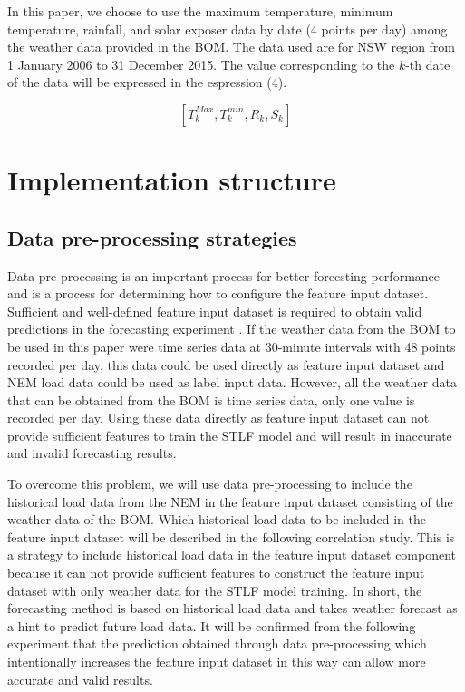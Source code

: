 \documentclass[runningheads,a4paper]{llncs}
\begin{document}
In this paper, we choose to use the maximum temperature, minimum temperature, rainfall, and solar exposer data by date (4 points per day) among the weather data provided in the BOM. The data used are for NSW region from 1 January 2006 to 31 December 2015. The value corresponding to the $ k $-th date of the data will be expressed in the espression (4).

\begin{equation}
\left [ T_{k}^{Max}, T_{k}^{min},  R_{k}, S_{k}\right ]
\end{equation}

\section{Implementation structure}

\subsection{Data pre-processing strategies}

Data pre-processing is an important process for better forecsting performance \cite{preprocessing} and is a process for determining how to configure the feature input dataset. Sufficient and well-defined feature input dataset is required to obtain valid predictions in the forecasting experiment \cite{welldefine_feature}. If the weather data from the BOM to be used in this paper were time series data at 30-minute intervals with 48 points recorded per day, this data could be used directly as feature input dataset and NEM load data could be used as label input data. However, all the weather data that can be obtained from the BOM is time series data, only one value is recorded per day. Using these data directly as feature input dataset can not provide sufficient features to train the STLF model and will result in inaccurate and invalid forecasting results.

To overcome this problem, we will use data pre-processing to include the historical load data from the NEM in the feature input dataset consisting of the weather data of the BOM. Which historical load data to  be included in the feature input dataset will be described in the following correlation study. This is a strategy to include historical load data in the feature input dataset component because it can not provide sufficient features to construct the feature input dataset with only weather data for the STLF model training. In short, the forecasting method is based on historical load data and takes weather forecast as a hint to predict future load data. It will be confirmed from the following experiment that the prediction obtained through data pre-processing which intentionally increases the feature input dataset in this way can allow more accurate and valid results.
\end{document}
